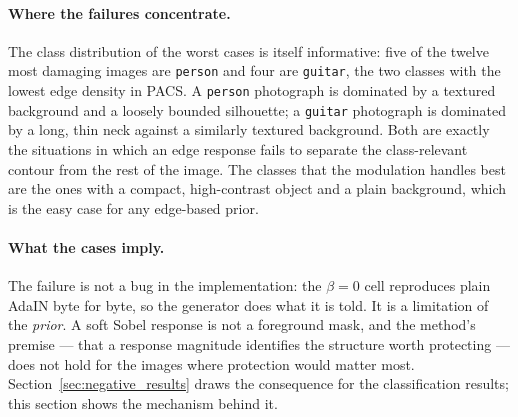 \paragraph{Where the failures concentrate.}
The class distribution of the worst cases is itself informative: five of
the twelve most damaging images are \texttt{person} and four are
\texttt{guitar}, the two classes with the lowest edge density in PACS. A
\texttt{person} photograph is dominated by a textured background and a
loosely bounded silhouette; a \texttt{guitar} photograph is dominated by a
long, thin neck against a similarly textured background. Both are exactly
the situations in which an edge response fails to separate the
class-relevant contour from the rest of the image. The classes that the
modulation handles best are the ones with a compact, high-contrast object
and a plain background, which is the easy case for any edge-based prior.

\paragraph{What the cases imply.}
The failure is not a bug in the implementation: the $\beta = 0$ cell
reproduces plain AdaIN byte for byte, so the generator does what it is
told. It is a limitation of the \emph{prior}. A soft Sobel response is
not a foreground mask, and the method's premise --- that a response
magnitude identifies the structure worth protecting --- does not hold for
the images where protection would matter most. Section~\ref{sec:negative_results}
draws the consequence for the classification results; this section shows
the mechanism behind it.

